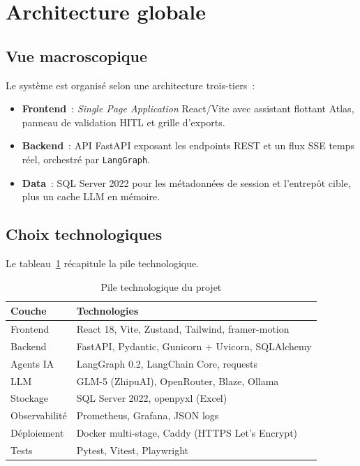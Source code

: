 \documentclass[12pt, a4paper]{report}
\begin{document}
\section{Architecture globale}

\subsection{Vue macroscopique}
Le système est organisé selon une architecture trois-tiers~:
\begin{itemize}
  \item \textbf{Frontend}~: \emph{Single Page Application} React/Vite
        avec assistant flottant Atlas, panneau de validation HITL
        et grille d'exports.
  \item \textbf{Backend}~: API FastAPI exposant les endpoints REST
        et un flux \ac{SSE} temps réel, orchestré par
        \texttt{LangGraph}.
  \item \textbf{Data}~: SQL Server 2022 pour les métadonnées de
        session et l'entrepôt cible, plus un cache LLM en mémoire.
\end{itemize}

\subsection{Choix technologiques}
Le tableau~\ref{tab:techstack} récapitule la pile technologique.

\begin{table}[H]
\centering
\caption{Pile technologique du projet}
\label{tab:techstack}
\begin{tabular}{ll}
\toprule
\textbf{Couche} & \textbf{Technologies} \\
\midrule
Frontend  & React 18, Vite, Zustand, Tailwind, framer-motion \\
Backend   & FastAPI, Pydantic, Gunicorn + Uvicorn, SQLAlchemy \\
Agents IA & LangGraph 0.2, LangChain Core, requests \\
LLM       & GLM-5 (ZhipuAI), OpenRouter, Blaze, Ollama \\
Stockage  & SQL Server 2022, openpyxl (Excel) \\
Observabilité & Prometheus, Grafana, JSON logs \\
Déploiement & Docker multi-stage, Caddy (HTTPS Let's Encrypt) \\
Tests      & Pytest, Vitest, Playwright \\
\bottomrule
\end{tabular}
\end{table}
\end{document}
